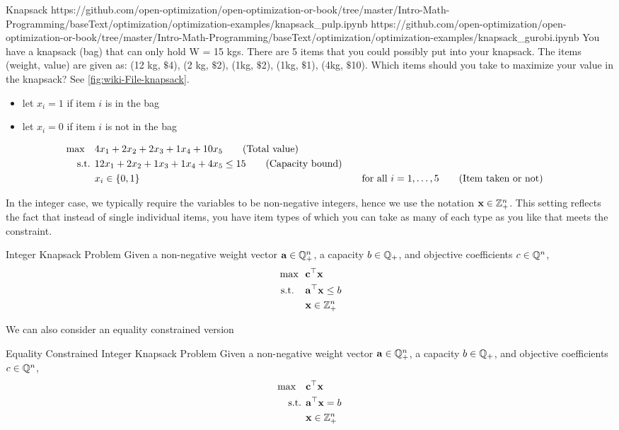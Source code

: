 \begin{examplewithallcode}{Knapsack}
{}
{https://github.com/open-optimization/open-optimization-or-book/tree/master/Intro-Math-Programming/baseText/optimization/optimization-examples/knapsack_pulp.ipynb}
{https://github.com/open-optimization/open-optimization-or-book/tree/master/Intro-Math-Programming/baseText/optimization/optimization-examples/knapsack_gurobi.ipynb}
\label{example:knapsack}
You have a knapsack (bag) that can only hold W = 15 kgs.  There are 5 items that you could possibly put into your knapsack.  The items (weight, value) are given as:
(12 kg, $\$$4), (2 kg, $\$$2), (1kg, $\$$2), (1kg, $\$$1), (4kg, $\$$10).  Which items should you take to maximize your value in the knapsack? See \autoref{fig:wiki-File-knapsack}.\\

\begin{itemize}
\item let $x_i = 1$ if item $i$ is in the bag
\item let $x_i = 0$ if item $i$ is not in the bag
\end{itemize}
\begin{align}
\max \quad & 4 x_1 + 2 x_2 + 2 x_3 + 1 x_4 + 10 x_5   \tag{Total value} \\
\mbox{ s.t. }        & 12 x_1 + 2 x_2 + 1 x_3 + 1 x_4 + 4 x_5 \leq 15   \tag{Capacity bound} \\
& x_i \in \{0,1\} &&\quad \mbox{for all } i=1, \dots, 5   \tag{Item taken or not}
\end{align}
\end{examplewithallcode}
In the integer case, we typically require the variables to be non-negative integers, hence we use the notation $\mathbf{x} \in \mathbb{Z}^n_+$.  This setting reflects the fact that instead of single individual items, you have item types of which you can take as many of each type as you like that meets the constraint.
\begin{general}{Integer Knapsack Problem}{\npcomplete}
Given a non-negative weight vector $\mathbf{a} \in \mathbb{Q}^n_+$, a capacity $b \in \mathbb{Q}_+$, and objective coefficients $c \in \mathbb{Q}^n$, 
\begin{equation}
\begin{split}
\max \ \ & \mathbf{c}^\top \mathbf{x}\\
\mbox{ s.t. } \ \ & \mathbf{a}^\top \mathbf{x} \leq b\\
& \mathbf{x} \in \mathbb{Z}^n_+
\end{split}
\end{equation}
\end{general}
We can also consider an equality constrained version
\begin{general}{Equality Constrained Integer Knapsack Problem}{\nphard}
Given a non-negative weight vector $\mathbf{a} \in \mathbb{Q}^n_+$, a capacity $b \in \mathbb{Q}_+$, and objective coefficients $c \in \mathbb{Q}^n$, 
\begin{align}
\max \quad & \mathbf{c}^\top \mathbf{x} \\
\mbox{ s.t. }        & \mathbf{a}^\top \mathbf{x} = b \\
& \mathbf{x} \in \mathbb{Z}^n_+
\end{align}
\end{general}



